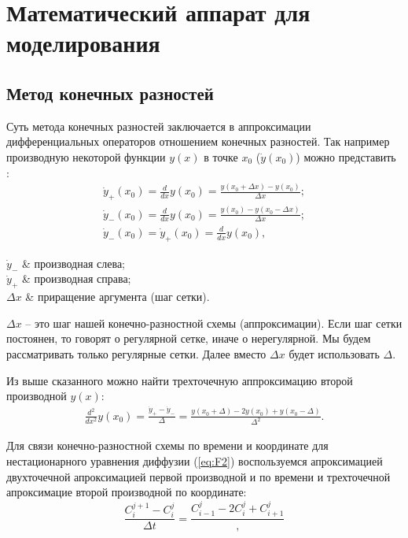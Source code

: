 \chapter{Математический аппарат для моделирования}

\section{Метод конечных разностей}
Суть метода конечных разностей заключается в аппроксимации дифференциальных операторов отношением конечных разностей. Так например производную некоторой функции $y(x)$ в точке $x_{0}$ ($\dot{y}(x_{0})$) можно представить \cite{Samarski}:
\begin{gather}
	\dot{y}_{+}(x_{0}) = \frac{d}{dx}y(x_{0}) = \frac{y(x_{0} + \Delta x) - y(x_{0})}{\Delta x };\\
	\dot{y}_{-}(x_{0}) = \frac{d}{dx}y(x_{0}) = \frac{ y(x_{0}) - y(x_{0} - \Delta x)}{\Delta x };\\
	\dot{y}_{-}(x_{0}) = \dot{y}_{+}(x_{0}) = \frac{d}{dx}y(x_{0}),
\end{gather}
\begin{conditions}
	$\dot{y}_{-}$ & производная слева;\\
	$\dot{y}_{+}$ & производная справа;\\
	$\Delta x$ & приращение аргумента (шаг сетки).
\end{conditions}

$\Delta x$ -- это шаг нашей конечно-разностной схемы (аппроксимации). Если шаг сетки постоянен, то говорят о регулярной сетке, иначе о нерегулярной. Мы будем рассматривать только регулярные сетки. Далее вместо $\Delta x$ будет использовать $\Delta$.

Из выше сказанного можно найти трехточечную аппроксимацию второй производной $y(x)$:
\begin{gather}
	\frac{d^{2}}{dx^{2}}y(x_{0}) = \frac{\dot{y}_{+} - \dot{y}_{-}}{\Delta} = \frac{y(x_{0} + \Delta) - 2y(x_{0}) + y(x_{0} - \Delta)}{ \Delta^{2}}.
\end{gather}

Для связи конечно-разностной схемы по времени и координате для нестационарного уравнения диффузии (\ref{eq:F2}) воспользуемся апроксимацией двухточечной апроксимацией первой производной и по времени и трехточечной апроксимацие второй производной по координате: 
\begin{equation}
	\label{eq:xt}
	\frac{C^{j+1}_{i} - C^{j}_{i}}{\Delta t} = \frac{C^{j}_{i-1} - 2C^{j}_{i} + C^{j}_{i+1}},
\end{equation}


